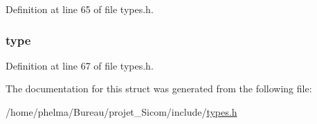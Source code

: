 Definition at line 65 of file types.\-h.

\hypertarget{struct__operande___a8c1cd31c6332f0be08cd6d98ebc22353}{
\subsubsection[{type}]{ type}}\label{struct__operande___a8c1cd31c6332f0be08cd6d98ebc22353}


Definition at line 67 of file types.\-h.



The documentation for this struct was generated from the following file\-:\begin{DoxyCompactItemize}
\item 
/home/phelma/\-Bureau/projet\-\_\-\-Sicom/include/\hyperlink{types_8h}{types.\-h}\end{DoxyCompactItemize}
